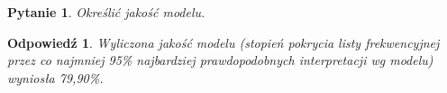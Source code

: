 \documentclass{article}
\newtheorem{task}{Pytanie}
\newtheorem{answer}{Odpowiedź}
\begin{document}
\begin{task}
Określić jakość modelu.
\end{task}

\begin{answer}
Wyliczona jakość modelu (stopień pokrycia listy frekwencyjnej przez co najmniej 95\% najbardziej prawdopodobnych interpretacji wg modelu) wyniosła 79,90\%.
\end{answer}


% 
% 
% 
\end{document}
